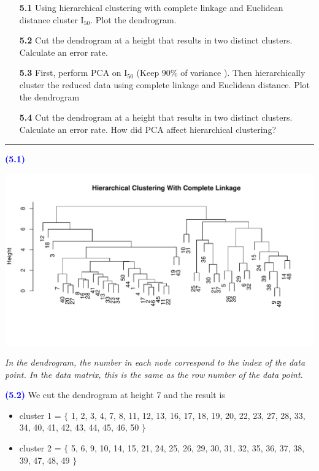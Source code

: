 \documentclass[a4paper,12pt]{article}
\newcommand{\qnum}[1]{\noindent\textcolor{blue}{\textbf{(#1)}}}
\newcommand{\sep}{\begin{center}\textcolor{gray}{\rule{\textwidth}{0.75pt}}\end{center}}
\begin{document}
 \begin{enumerate}
  \item[\textbf{5.1}]  Using hierarchical clustering with complete linkage and Euclidean distance cluster $\text{I}_{50}$. Plot the dendrogram.
\\ 
 
\item[\textbf{5.2}] Cut the dendrogram at a height that results in two distinct  clusters. Calculate an error rate.
\\  


  \item[\textbf{5.3}] First, perform PCA on $\text{I}_{50}$ (Keep $90\%$ of variance ). Then hierarchically cluster the reduced data using complete linkage and Euclidean distance. Plot the dendrogram
\\  
  
  
    \item[\textbf{5.4}]  Cut the dendrogram at a height that results in two distinct  clusters. Calculate an error rate. How  did PCA affect hierarchical clustering?
\end{enumerate}
\sep 

\qnum{5.1}
\begin{center}
  \includegraphics[width=1\linewidth]{Image/Prob5-1.pdf}
  
  \vspace{-40pt}
  \parbox{0.9\textwidth}{\textit{In the dendrogram, the number in each node correspond to the index of the data point. In the data matrix, this is the same as the row number of the data point.
  }}
\end{center}
\bigskip\bigskip

\qnum{5.2}
We cut the dendrogram at height 7 and the result is 
\begin{itemize}
    \item cluster 1 = $\{$
        1, 2, 3, 4, 7, 8, 11, 12, 13, 16, 17, 18, 19, 20, 22, 23, 27, 28, 33, 34, 40, 41, 42, 43, 44, 45, 46, 50
    $\}$
    \item cluster 2 = $\{$
        5, 6, 9, 10, 14, 15, 21, 24, 25, 26, 29, 30, 31, 32, 35, 36, 37, 38, 39, 47, 48, 49
    $\}$
\end{itemize}
\end{document}

